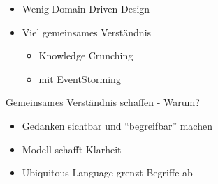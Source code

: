 
\begin{frame}[fragile]{}

\begin{itemize}
\item Wenig Domain-Driven Design
\item Viel gemeinsames Verständnis
\begin{itemize}
\item Knowledge Crunching
\item mit EventStorming
\end{itemize}

\end{itemize}

\end{frame}



\begin{frame}[fragile]{Gemeinsames Verständnis schaffen - Warum?}

\begin{itemize}
\item Gedanken sichtbar und ``begreifbar'' machen
\item Modell schafft Klarheit
\item Ubiquitous Language grenzt Begriffe ab
\end{itemize}

\end{frame}



\begin{frame}[fragile]{}


\end{frame}


